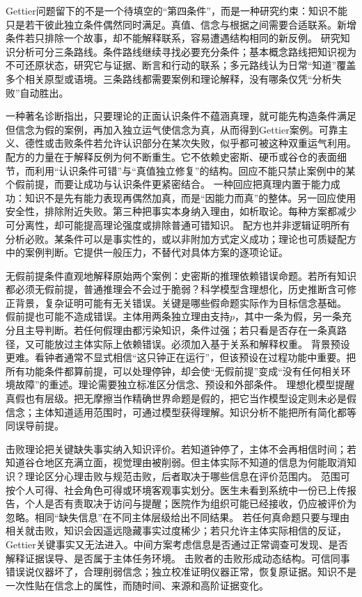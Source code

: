  Gettier问题留下的不是一个待填空的“第四条件”，而是一种研究约束：知识不能只是若干彼此独立条件偶然同时满足。真值、信念与根据之间需要合适联系。新增条件若只排除一个故事，却不能解释联系，容易遭遇结构相同的新反例。 研究知识分析可分三条路线。条件路线继续寻找必要充分条件；基本概念路线把知识视为不可还原状态，研究它与证据、断言和行动的联系；多元路线认为日常“知道”覆盖多个相关原型或语境。三条路线都需要案例和理论解释，没有哪条仅凭“分析失败”自动胜出。

一种著名诊断指出，只要理论的正面认识条件不蕴涵真理，就可能先构造条件满足但信念为假的案例，再加入独立运气使信念为真，从而得到Gettier案例\parencite{zagzebski1994}。可靠主义、德性或击败条件若允许认识部分在某次失败，似乎都可被这种双重运气利用。 配方的力量在于解释反例为何不断重生。它不依赖史密斯、硬币或谷仓的表面细节，而利用“认识条件可错”与“真值独立修复”的结构。回应不能只禁止案例中的某个假前提，而要让成功与认识条件更紧密结合。 一种回应把真理内置于能力成功：知识不是先有能力表现再偶然加真，而是“因能力而真”的整体。另一回应使用安全性，排除附近失败。第三种把事实本身纳入理由，如析取论。每种方案都减少可分离性，却可能提高理论强度或排除普通可错知识。 配方也并非逻辑证明所有分析必败。某条件可以是事实性的，或以非附加方式定义成功；理论也可质疑配方中的案例判断。它提供一般压力，不替代对具体方案的逐项论证。

无假前提条件直观地解释原始两个案例：史密斯的推理依赖错误命题。若所有知识都必须无假前提，普通推理会不会过于脆弱？科学模型含理想化，历史推断含可修正背景，复杂证明可能有无关错误。关键是哪些假命题实际作为目标信念基础。 假前提也可能不造成错误。主体用两条独立理由支持$p$，其中一条为假，另一条充分且主导判断。若任何假理由都污染知识，条件过强；若只看是否存在一条真路径，又可能放过主体实际上依赖错误。必须加入基于关系和解释权重。 背景预设更难。看钟者通常不显式相信“这只钟正在运行”，但该预设在过程功能中重要。把所有功能条件都算前提，可以处理停钟，却会使“无假前提”变成“没有任何相关环境故障”的重述。理论需要独立标准区分信念、预设和外部条件。 理想化模型提醒真假也有层级。把无摩擦当作精确世界命题是假的，把它当作模型设定则未必是假信念；主体知道适用范围时，可通过模型获得理解。知识分析不能把所有简化都等同误导前提。

击败理论把关键缺失事实纳入知识评价。若知道钟停了，主体不会再相信时间；若知道谷仓地区充满立面，视觉理由被削弱。但主体实际不知道的信息为何能取消知识？理论区分心理击败与规范击败，后者取决于哪些信息在评价范围内。 范围可按个人可得、社会角色可得或环境客观事实划分。医生未看到系统中一份已上传报告，个人是否有责取决于访问与提醒；医院作为组织可能已经接收，仍应被评价为忽略。相同“缺失信息”在不同主体层级给出不同结果。 若任何真命题只要与理由相关就击败，知识会因遥远隐藏事实过度稀少；若只允许主体实际相信的反证，Gettier关键事实又无法进入。中间方案考虑信息是否通过正常调查可发现、是否解释证据误导、是否属于主体任务环境。 击败者的击败形成动态结构。可信同事错误说仪器坏了，合理削弱信念；独立校准证明仪器正常，恢复原证据。知识不是一次性贴在信念上的属性，而随时间、来源和高阶证据变化。

